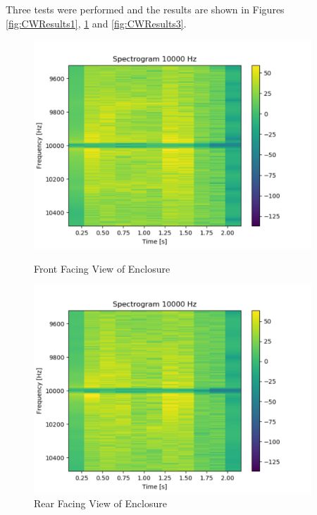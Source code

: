 Three tests were performed and the results are shown in Figures \ref{fig:CWResults1}, \ref{fig:CWResults2} and \ref{fig:CWResults3}.

\begin{figure}[h!]
    \centering
    \begin{minipage}{0.48\textwidth}
        \centering
        \includegraphics[width = 0.93\textwidth]{images/CWResults1.pdf}
        \caption{Front Facing View of Enclosure}\label{fig:CWResults1}
    \end{minipage}\hfill
    \begin{minipage}{0.48\textwidth}
        \centering
        \includegraphics[width=0.93\textwidth]{images/CWResults2.pdf}
        \caption{Rear Facing View of Enclosure}\label{fig:CWResults2}
    \end{minipage}
\end{figure}

